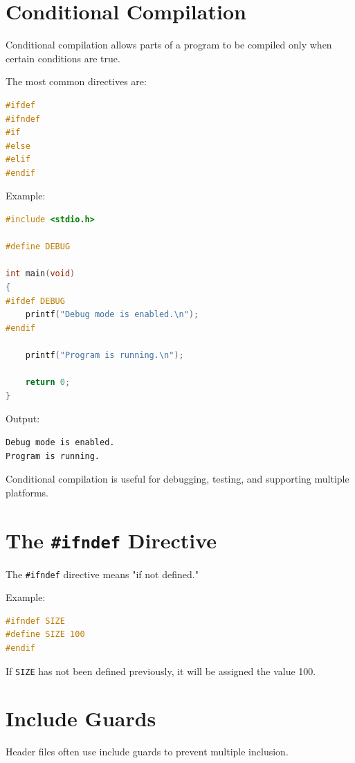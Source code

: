\documentclass[12pt,openany]{book}
\begin{document}
\section{Conditional Compilation}

Conditional compilation allows parts of a program to be compiled only when certain conditions are true.

The most common directives are:

\begin{lstlisting}[language=C]
#ifdef
#ifndef
#if
#else
#elif
#endif
\end{lstlisting}

Example:

\begin{lstlisting}[language=C]
#include <stdio.h>

#define DEBUG

int main(void)
{
#ifdef DEBUG
    printf("Debug mode is enabled.\n");
#endif

    printf("Program is running.\n");

    return 0;
}
\end{lstlisting}

Output:

\begin{lstlisting}
Debug mode is enabled.
Program is running.
\end{lstlisting}

Conditional compilation is useful for debugging, testing, and supporting multiple platforms.

\section{The \texttt{\#ifndef} Directive}

The \texttt{\#ifndef} directive means "if not defined."

Example:

\begin{lstlisting}[language=C]
#ifndef SIZE
#define SIZE 100
#endif
\end{lstlisting}

If \texttt{SIZE} has not been defined previously, it will be assigned the value 100.

\section{Include Guards}

Header files often use include guards to prevent multiple inclusion.
\end{document}
